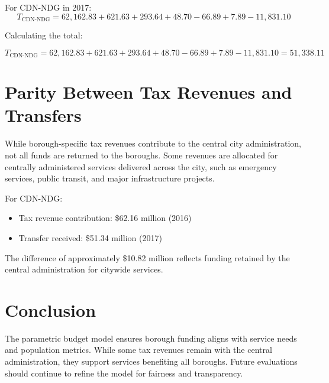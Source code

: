 \documentclass{article}
\begin{document}
For CDN-NDG in 2017:
\[
T_{\text{CDN-NDG}} = 62,162.83 + 621.63 + 293.64 + 48.70 - 66.89 + 7.89 - 11,831.10
\]

Calculating the total:

\[
T_{\text{CDN-NDG}} = 62,162.83 + 621.63 + 293.64 + 48.70 - 66.89 + 7.89 - 11,831.10 = 51,338.11
\]

\section{Parity Between Tax Revenues and Transfers}
While borough-specific tax revenues contribute to the central city administration, not all funds are returned to the boroughs. Some revenues are allocated for centrally administered services delivered across the city, such as emergency services, public transit, and major infrastructure projects.

For CDN-NDG:
\begin{itemize}
    \item Tax revenue contribution: \$62.16 million (2016)
    \item Transfer received: \$51.34 million (2017)
\end{itemize}

The difference of approximately \$10.82 million reflects funding retained by the central administration for citywide services.

\section{Conclusion}
The parametric budget model ensures borough funding aligns with service needs and population metrics. While some tax revenues remain with the central administration, they support services benefiting all boroughs. Future evaluations should continue to refine the model for fairness and transparency.
\end{document}
